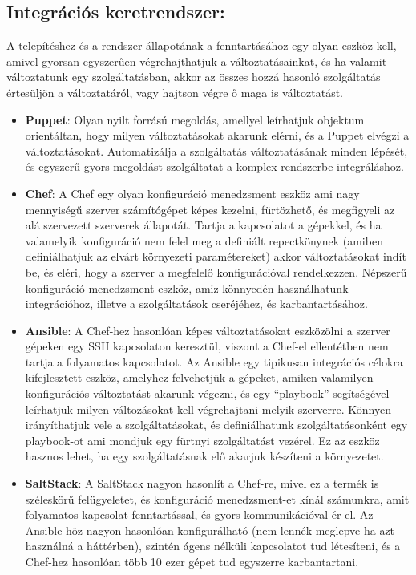 \documentclass[11pt,magyar,a4paper,oneside,]{report}
\begin{document}
\subsection{Integrációs
keretrendszer:}\label{integruxe1ciuxf3s-keretrendszer}

A telepítéshez és a rendszer állapotának a fenntartásához egy olyan
eszköz kell, amivel gyorsan egyszerűen végrehajthatjuk a
változtatásainkat, és ha valamit változtatunk egy szolgáltatásban, akkor
az összes hozzá hasonló szolgáltatás értesüljön a változtatáról, vagy
hajtson végre ő maga is változtatást.

\begin{itemize}
\item
  \textbf{Puppet}: Olyan nyilt forrású megoldás, amellyel leírhatjuk
  objektum orientáltan, hogy milyen változtatásokat akarunk elérni, és a
  Puppet elvégzi a változtatásokat. Automatizálja a szolgáltatás
  változtatásának minden lépését, és egyszerű gyors megoldást
  szolgáltatat a komplex rendszerbe integráláshoz.
\item
  \textbf{Chef}: A Chef egy olyan konfiguráció menedzsment eszköz ami
  nagy mennyiségű szerver számítógépet képes kezelni, fürtözhető, és
  megfigyeli az alá szervezett szerverek állapotát. Tartja a kapcsolatot
  a gépekkel, és ha valamelyik konfiguráció nem felel meg a definiált
  repectkönynek (amiben definiálhatjuk az elvárt környezeti
  paramétereket) akkor változtatásokat indít be, és eléri, hogy a
  szerver a megfelelő konfigurációval rendelkezzen. Népszerű
  konfiguráció menedzsment eszköz, amiz könnyedén használhatunk
  integrációhoz, illetve a szolgáltatások cseréjéhez, és
  karbantartásához.
\item
  \textbf{Ansible}: A Chef-hez hasonlóan képes változtatásokat
  eszközölni a szerver gépeken egy SSH kapcsolaton keresztül, viszont a
  Chef-el ellentétben nem tartja a folyamatos kapcsolatot. Az Ansible
  egy tipikusan integrációs célokra kifejlesztett eszköz, amelyhez
  felvehetjük a gépeket, amiken valamilyen konfigurációs változtatást
  akarunk végezni, és egy ``playbook'' segítségével leírhatjuk milyen
  változásokat kell végrehajtani melyik szerverre. Könnyen irányíthatjuk
  vele a szolgáltatásokat, és definiálhatunk szolgáltatásonként egy
  playbook-ot ami mondjuk egy fürtnyi szolgáltatást vezérel. Ez az
  eszköz hasznos lehet, ha egy szolgáltatásnak elő akarjuk készíteni a
  környezetet.
\item
  \textbf{SaltStack}: A SaltStack nagyon hasonlít a Chef-re, mivel ez a
  termék is széleskörű felügyeletet, és konfiguráció menedzsment-et
  kínál számunkra, amit folyamatos kapcsolat fenntartással, és gyors
  kommunikációval ér el. Az Ansible-höz nagyon hasonlóan konfigurálható
  (nem lennék meglepve ha azt használná a háttérben), szintén ágens
  nélküli kapcsolatot tud létesíteni, és a Chef-hez hasonlóan több 10
  ezer gépet tud egyszerre karbantartani.
\end{itemize}
\end{document}

